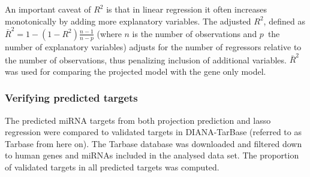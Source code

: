 An important caveat of $R^2$ is that in linear regression it often increases
monotonically by adding more explanatory variables. The adjusted $R^2$,
defined as $\bar{R}^2 = 1-(1-R^2)\frac{n-1}{n-p}$ (where $n$ is the number of
observations and $p$ the number of explanatory variables) adjusts for the
number of regressors relative to the number of observations, thus penalizing
inclusion of additional variables. $\bar{R}^2$ was used for comparing the
projected model with the gene only model.



\subsubsection{Verifying predicted targets}

The predicted miRNA targets from both projection prediction and lasso
regression were compared to validated targets in DIANA-TarBase 
\citep{Vlachos2015} (referred to as Tarbase from here on). The Tarbase
database was downloaded and filtered down to human genes and miRNAs included
in the analysed data set. The proportion of validated targets in all predicted
targets was computed.
